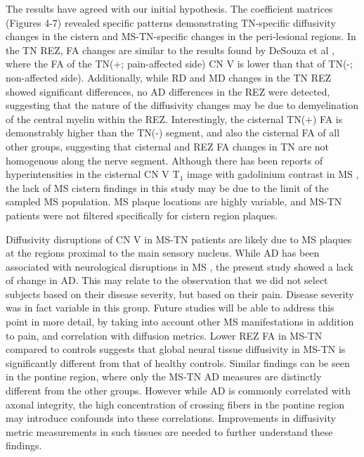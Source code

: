 The results have agreed with our initial hypothesis. The coefficient matrices (Figures 4-7) revealed specific patterns demonstrating TN-specific diffusivity changes in the cistern and MS-TN-specific changes in the peri-lesional regions. In the TN REZ, FA changes are similar to the results found by DeSouza et al \cite{Desouza2013,Desouza2013c}, where the FA of the TN(+; pain-affected side) CN V is lower than that of TN(-; non-affected side). Additionally, while RD and MD changes in the TN REZ showed significant differences, no AD differences in the REZ were detected, suggesting that the nature of the diffusivity changes may be due to demyelination of the central myelin within the REZ. Interestingly, the cisternal TN(+) FA is demonstrably higher than the TN(-) segment, and also the cisternal FA of all other groups, suggesting that cisternal and REZ FA changes in TN are not homogenous along the nerve segment. Although there has been reports of hyperintensities in the cisternal CN V T$_{1}$ image with gadolinium contrast in MS \cite{VanderMeijs2002}, the lack of MS cistern findings in this study may be due to the limit of the sampled MS population. MS plaque locations are highly variable, and MS-TN patients were not filtered specifically for cistern region plaques. 

Diffusivity disruptions of CN V in MS-TN patients are likely due to MS plaques at the regions proximal to the main sensory nucleus. While AD has been associated with neurological disruptions in MS \cite{Budde2009,Kim2006}, the present study showed a lack of change in AD. This may relate to the observation that we did not select subjects based on their disease severity, but based on their pain. Disease severity was in fact variable in this group. Future studies will be able to address this point in more detail, by taking into account other MS manifestations in addition to pain, and correlation with diffusion metrics. Lower REZ FA in MS-TN compared to controls suggests that global neural tissue diffusivity in MS-TN is significantly different from that of healthy controls. Similar findings can be seen in the pontine region, where only the MS-TN AD measures are distinctly different from the other groups. However while AD is commonly correlated with axonal integrity, the high concentration of crossing fibers in the pontine region may introduce confounds into these correlations. Improvements in diffusivity metric measurements in such tissues are needed to further understand these findings. 

